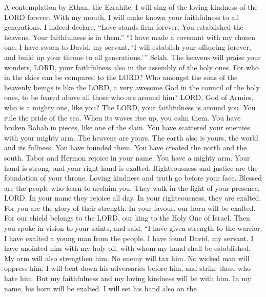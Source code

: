 A contemplation by Ethan, the Ezrahite.  I will sing of
the loving kindness of the LORD forever. With my mouth, I will make
known your faithfulness to all generations.  I indeed
declare, ``Love stands firm forever. You established the heavens. Your
faithfulness is in them.''  ``I have made a covenant with
my chosen one, I have sworn to David, my servant,  `I will
establish your offspring forever, and build up your throne to all
generations.'\,'' Selah.  The heavens will praise your
wonders, LORD, your faithfulness also in the assembly of the holy ones.
 For who in the skies can be compared to the LORD? Who
amongst the sons of the heavenly beings is like the LORD, 
a very awesome God in the council of the holy ones, to be feared above
all those who are around him?  LORD, God of Armies, who is
a mighty one, like you? The LORD, your faithfulness is around you.
 You rule the pride of the sea. When its waves rise up,
you calm them.  You have broken Rahab in pieces, like one
of the slain. You have scattered your enemies with your mighty arm.
 The heavens are yours. The earth also is yours, the
world and its fullness. You have founded them.  You have
created the north and the south. Tabor and Hermon rejoice in your name.
 You have a mighty arm. Your hand is strong, and your
right hand is exalted.  Righteousness and justice are the
foundation of your throne. Loving kindness and truth go before your
face.  Blessed are the people who learn to acclaim you.
They walk in the light of your presence, LORD.  In your
name they rejoice all day. In your righteousness, they are exalted.
 For you are the glory of their strength. In your favour,
our horn will be exalted.  For our shield belongs to the
LORD, our king to the Holy One of Israel.  Then you spoke
in vision to your saints, and said, ``I have given strength to the
warrior. I have exalted a young man from the people.  I
have found David, my servant. I have anointed him with my holy oil,
 with whom my hand shall be established. My arm will also
strengthen him.  No enemy will tax him. No wicked man
will oppress him.  I will beat down his adversaries
before him, and strike those who hate him.  But my
faithfulness and my loving kindness will be with him. In my name, his
horn will be exalted.  I will set his hand also on the
